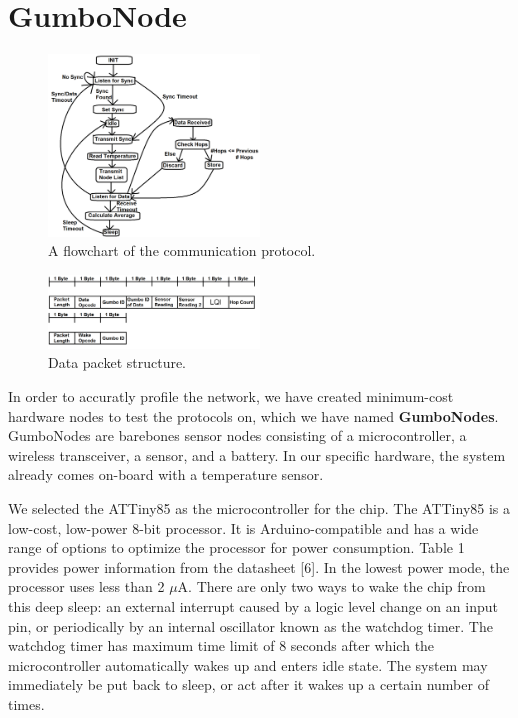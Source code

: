\section{GumboNode}
\label{section:gumbo_node}

\begin{figure}[h!]
  \centering
  \includegraphics[width=0.5\textwidth]{images/algorithm_flowchart.png}
  \caption{A flowchart of the communication protocol.
  \label{img:flowchart}
  }
\end{figure}

\begin{figure}[h!]
  \centering
  \includegraphics[width=0.5\textwidth]{images/data_packet.png}
  \caption{Data packet structure.
  \label{img:flowchart}
  }
\end{figure}

In order to accuratly profile the network, we have created minimum-cost hardware nodes to test the protocols on, which we have named
\textbf{GumboNodes}.  GumboNodes are barebones sensor nodes consisting of a microcontroller, a wireless transceiver, a sensor, and a battery. In our specific hardware, the system already comes on-board with a temperature sensor. 

We selected the ATTiny85 as the microcontroller for the chip. The ATTiny85 is a low-cost, low-power 8-bit processor. It is Arduino-compatible and has a wide range of options to optimize the processor for power consumption. Table 1 provides power information from the datasheet [6]. In the lowest power mode, the processor uses less than 2 $\mu$A. There are only two ways to wake the chip from this deep sleep: an external interrupt caused by a logic level change on an input pin, or periodically by an internal oscillator known as the watchdog timer. The watchdog timer has maximum time limit of 8 seconds after which the microcontroller automatically wakes up and enters idle state. The system may immediately be put back to sleep, or act after it wakes up a certain number of times.

